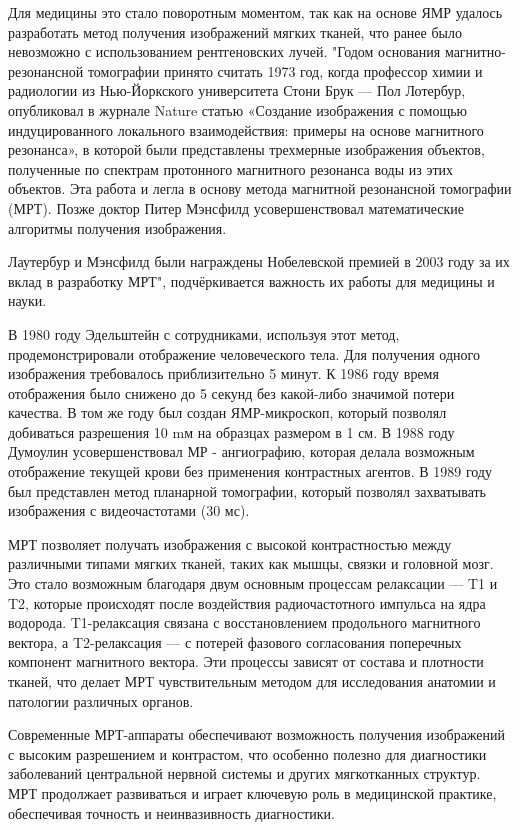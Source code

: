 Для медицины это стало поворотным моментом, так как на основе ЯМР удалось разработать метод получения изображений мягких тканей, что ранее было невозможно с использованием рентгеновских лучей. "Годом основания магнитно-резонансной томографии принято считать 1973 год, когда профессор химии и радиологии из Нью-Йоркского университета Стони Брук — Пол Лотербур, опубликовал в журнале Nature статью «Создание изображения с помощью индуцированного локального взаимодействия: примеры на основе магнитного резонанса», в которой были представлены трехмерные изображения объектов, полученные по спектрам протонного магнитного резонанса воды из этих объектов. Эта работа и легла в основу метода магнитной резонансной томографии (МРТ). Позже доктор Питер Мэнсфилд усовершенствовал математические алгоритмы получения изображения\cite{two}.

Лаутербур и Мэнсфилд были награждены Нобелевской премией в 2003 году за их вклад в разработку МРТ", подчёркивается важность их работы для медицины и науки\cite{history}.

В 1980 году Эдельштейн с сотрудниками, используя этот метод, продемонстрировали отображение человеческого тела. Для получения одного изображения требовалось приблизительно 5 минут. К 1986 году время отображения было снижено до 5 секунд без какой-либо значимой потери качества. В том же году был создан ЯМР-микроскоп, который позволял добиваться разрешения 10 mм на образцах размером в 1 см. В 1988 году Думоулин усовершенствовал МР - ангиографию, которая делала возможным отображение текущей крови без применения контрастных агентов. В 1989 году был представлен метод планарной томографии, который позволял захватывать изображения с видеочастотами (30 мс)\cite{two}.

МРТ позволяет получать изображения с высокой контрастностью между различными типами мягких тканей, таких как мышцы, связки и головной мозг. Это стало возможным благодаря двум основным процессам релаксации — T1 и T2, которые происходят после воздействия радиочастотного импульса на ядра водорода. T1-релаксация связана с восстановлением продольного магнитного вектора, а T2-релаксация — с потерей фазового согласования поперечных компонент магнитного вектора. Эти процессы зависят от состава и плотности тканей, что делает МРТ чувствительным методом для исследования анатомии и патологии различных органов\cite{history}.

Современные МРТ-аппараты обеспечивают возможность получения изображений с высоким разрешением и контрастом, что особенно полезно для диагностики заболеваний центральной нервной системы и других мягкотканных структур. МРТ продолжает развиваться и играет ключевую роль в медицинской практике, обеспечивая точность и неинвазивность диагностики\cite{history}.
